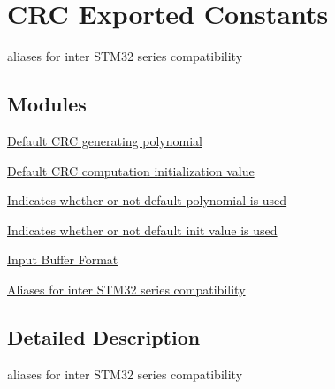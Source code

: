 \hypertarget{group___c_r_c___exported___constants}{}\section{C\+RC Exported Constants}
\label{group___c_r_c___exported___constants}


aliases for inter S\+T\+M32 series compatibility  


\subsection*{Modules}
\begin{DoxyCompactItemize}
\item 
\hyperlink{group___c_r_c___default___polynomial___value}{Default C\+R\+C generating polynomial}
\item 
\hyperlink{group___c_r_c___default___init_value}{Default C\+R\+C computation initialization value}
\item 
\hyperlink{group___c_r_c___default___polynomial}{Indicates whether or not default polynomial is used}
\item 
\hyperlink{group___c_r_c___default___init_value___use}{Indicates whether or not default init value is used}
\item 
\hyperlink{group___c_r_c___input___buffer___format}{Input Buffer Format}
\item 
\hyperlink{group___c_r_c___aliases}{Aliases for inter S\+T\+M32 series compatibility}
\end{DoxyCompactItemize}


\subsection{Detailed Description}
aliases for inter S\+T\+M32 series compatibility 

